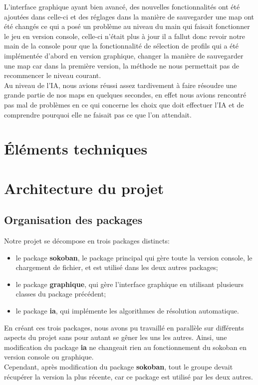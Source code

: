 \documentclass[a4paper,12pt]{article} %
\begin{document}
L'interface graphique ayant bien avancé, des nouvelles fonctionnalités ont été ajoutées dans celle-ci et des réglages dans la manière de sauvegarder une map ont été changés ce qui a posé un problème au niveau du main qui faisait fonctionner le jeu en version console, celle-ci n'était plus à jour il a fallut donc revoir notre main de la console pour que la fonctionnalité de sélection de profils qui a été implémentée d'abord en version graphique, changer la manière de sauvegarder une map car dans la première version, la méthode ne nous permettait pas de recommencer le niveau courant.\\

Au niveau de l'IA, nous avions réussi assez tardivement à faire résoudre une grande partie de nos maps en quelques secondes, en effet nous avions rencontré pas mal de problèmes en ce qui concerne les choix que doit effectuer l'IA et de comprendre pourquoi elle ne faisait pas ce que l'on attendait.

\section{Éléments techniques}

\section{Architecture du projet}

\subsection{Organisation des packages}

Notre projet se décompose en trois packages distincts:
\begin{itemize}
\item le package \textbf{sokoban}, le package principal qui gère toute la version console, le chargement de fichier, et est utilisé dans les deux autres packages;
\item le package \textbf{graphique}, qui gère l'interface graphique en utilisant plusieurs classes du package précédent;
\item le package \textbf{ia}, qui implémente les algorithmes de résolution automatique.
\end{itemize}

En créant ces trois packages, nous avons pu travaillé en parallèle sur différents aspects du projet sans pour autant se gêner les uns les autres.
Ainsi, une modification du package \textbf{ia} ne changeait rien au fonctionnement du sokoban en version console ou graphique.
\\
Cependant, après modification du package \textbf{sokoban}, tout le groupe devait récupérer la version la plus récente, car ce package est utilisé par les deux autres.
\end{document}
